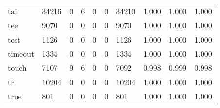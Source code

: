 \begin{longtable}{lp{2.0cm}p{2.0cm}p{2.0cm}p{2.0cm}p{2.0cm}p{2.0cm}p{2.0cm}p{2.0cm}p{2.0cm}}
tail      &                  34216 &                                  0 &                                 6 &                                0 &                                 0 &                           34210 &                                   1.000 &                                  1.000 &                                1.000 \\
tee       &                   9070 &                                  0 &                                 0 &                                0 &                                 0 &                            9070 &                                   1.000 &                                  1.000 &                                1.000 \\
test      &                   1126 &                                  0 &                                 0 &                                0 &                                 0 &                            1126 &                                   1.000 &                                  1.000 &                                1.000 \\
timeout   &                   1334 &                                  0 &                                 0 &                                0 &                                 0 &                            1334 &                                   1.000 &                                  1.000 &                                1.000 \\
touch     &                   7107 &                                  9 &                                 6 &                                0 &                                 0 &                            7092 &                                   0.998 &                                  0.999 &                                0.998 \\
tr        &                  10204 &                                  0 &                                 0 &                                0 &                                 0 &                           10204 &                                   1.000 &                                  1.000 &                                1.000 \\
true      &                    801 &                                  0 &                                 0 &                                0 &                                 0 &                             801 &                                   1.000 &                                  1.000 &                                1.000 \\

\end{longtable}
